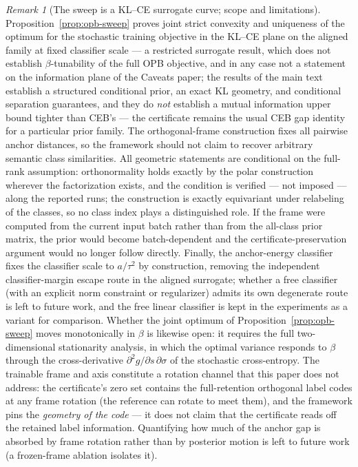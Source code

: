 \documentclass{article}
\theoremstyle{plain}
\theoremstyle{remark}
\newtheorem{remark}{Remark}[section]
\begin{document}
\begin{remark}[The sweep is a KL--CE surrogate curve; scope and limitations]
\label{rem:opb-scope}
Proposition~\ref{prop:opb-sweep} proves joint strict convexity and uniqueness of the
optimum for the stochastic training objective in the KL--CE plane on the aligned
family at fixed classifier scale --- a restricted surrogate result, which does not
establish $\beta$-tunability of the full OPB objective, and in any case not a
statement on the information plane of the Caveats paper; the results of the main text
establish a structured conditional prior, an exact KL geometry, and conditional
separation guarantees, and they do \emph{not} establish a mutual information upper
bound tighter than CEB's --- the certificate remains the usual CEB gap identity for a
particular prior family. The orthogonal-frame construction fixes all pairwise anchor
distances, so the framework should not claim to recover arbitrary semantic class
similarities. All geometric statements are conditional on the full-rank assumption:
orthonormality holds exactly by the polar construction wherever the factorization
exists, and the condition is verified --- not imposed --- along the reported runs;
the construction is exactly equivariant under relabeling of the classes, so no class
index plays a distinguished role. If the frame were computed from the current input
batch rather than from the all-class prior matrix, the prior would become
batch-dependent and the certificate-preservation argument would no longer follow
directly. Finally, the anchor-energy classifier fixes the classifier scale to
$a/\tau^2$ by construction, removing the independent classifier-margin escape route
in the aligned surrogate; whether a free classifier (with an explicit norm constraint
or regularizer) admits its own degenerate route is left to future work, and the free
linear classifier is kept in the experiments as a variant for comparison. Whether the
joint optimum of Proposition~\ref{prop:opb-sweep} moves monotonically in $\beta$ is
likewise open: it requires the full two-dimensional stationarity analysis, in which
the optimal variance responds to $\beta$ through the cross-derivative
$\partial^2 g/\partial s\,\partial\sigma$ of the stochastic cross-entropy. The
trainable frame and axis constitute a rotation channel that this paper does not
address: the certificate's zero set contains the full-retention orthogonal label
codes at any frame rotation (the reference can rotate to meet them), and the
framework pins the \emph{geometry of the code} --- it does not claim that the
certificate reads off the retained label information. Quantifying how much of the
anchor gap is absorbed by frame rotation rather than by posterior motion is left to
future work (a frozen-frame ablation isolates it).
\end{remark}
\end{document}
